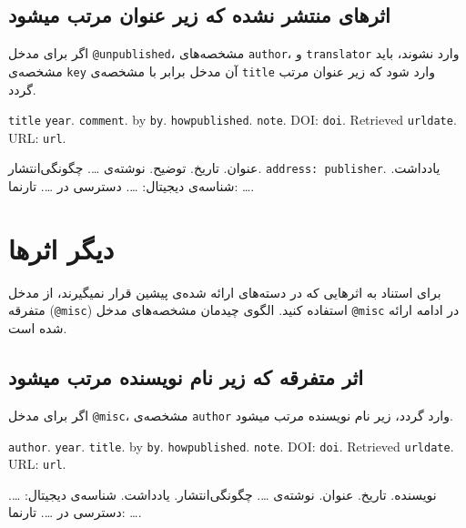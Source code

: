 \documentclass[a4paper,11pt]{article}
\begin{document}
\subsection{اثرهای منتشر نشده که زیر عنوان مرتب میشود}
اگر برای مدخل \verb|@unpublished|، مشخصه‌های \verb|author|، و \verb|translator| وارد نشوند، باید مشخصه‌ی \verb|key| آن مدخل برابر با مشخصه‌ی \verb|title| وارد شود که زیر عنوان مرتب گردد.

\begin{itemize}[nosep]
\begin{latin}
\item[] []
{\tt title} {\tt year}. {\tt comment}. by {\tt by}. {\tt howpublished}. {\tt note}. DOI: {\tt doi}. Retrieved {\tt urldate}. URL: {\tt url}. 
\end{latin}

\item[] []
{\persianttfamily عنوان}. {\persianttfamily تاریخ}. {\persianttfamily توضیح}. نوشته‌ی {\persianttfamily …}. {\persianttfamily چگونگی‌انتشار}. {\tt address: publisher}. {\persianttfamily یادداشت}. شناسه‌ی دیجیتال: {\persianttfamily …}. دسترسی در {\persianttfamily …}. تارنما: {\persianttfamily …}. 
\end{itemize}










\section{دیگر اثرها}
برای استناد به اثرهایی که در دسته‌های ارائه شده‌ی پیشین قرار نمیگیرند، از مدخل متفرقه (\verb|@misc|) استفاده کنید. الگوی چیدمان مشخصه‌های مدخل \verb|@misc| در ادامه ارائه شده است.





\subsection{اثر متفرقه که زیر نام نویسنده مرتب میشود}
اگر برای مدخل \verb|@misc|، مشخصه‌ی \verb|author| وارد گردد، زیر نام نویسنده مرتب میشود.

\begin{itemize}[nosep]
\begin{latin}
\item[] []
{\tt author}. {\tt year}. {\tt title}. by {\tt by}. {\tt howpublished}. {\tt note}. DOI: {\tt doi}. Retrieved {\tt urldate}. URL: {\tt url}. 
\end{latin}

\item[] []
{\persianttfamily نویسنده}. {\persianttfamily تاریخ}. {\persianttfamily عنوان}. نوشته‌ی {\persianttfamily …}. {\persianttfamily چگونگی‌انتشار}. {\persianttfamily یادداشت}. شناسه‌ی دیجیتال: {\persianttfamily …}. دسترسی در {\persianttfamily …}. تارنما: {\persianttfamily …}. 
\end{itemize}
\end{document}
